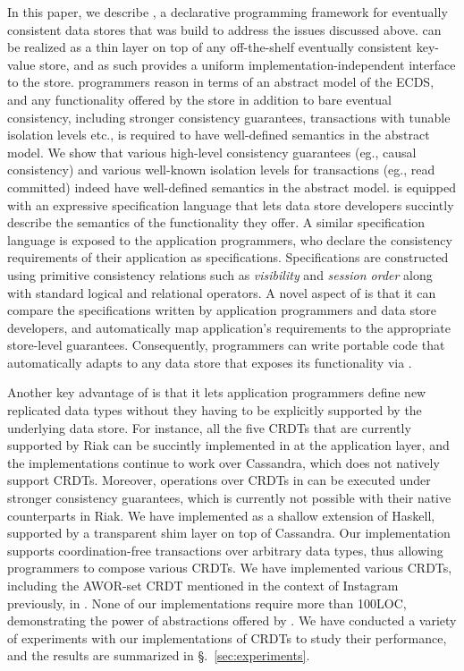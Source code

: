 In this paper, we describe \name, a declarative programming framework
for eventually consistent data stores that was build to address the
issues discussed above. \name can be realized as a thin layer on top
of any off-the-shelf eventually consistent key-value store, and as
such provides a uniform implementation-independent interface to the
store. \name programmers reason in terms of an abstract model of the
ECDS, and any functionality offered by the store in addition to bare
eventual consistency, including stronger consistency guarantees,
transactions with tunable isolation levels etc., is required to have
well-defined semantics in the abstract model. We show that various
high-level consistency guarantees (eg., causal consistency) and
various well-known isolation levels for transactions (eg., read
committed) indeed have well-defined semantics in the abstract model.
\name is equipped with an expressive specification language that lets
data store developers succintly describe the semantics of the
functionality they offer. A similar specification language is exposed
to the application programmers, who declare the consistency
requirements of their application as specifications. Specifications
are constructed using primitive consistency relations such as
\emph{visibility} and \emph{session order} along with standard logical
and relational operators. A novel aspect of \name is that it can
compare the specifications written by application programmers and data
store developers, and automatically map application's requirements to
the appropriate store-level guarantees. Consequently, \name
programmers can write portable code that automatically adapts to any
data store that exposes its functionality via \name. 

Another key advantage of \name is that it lets application programmers
define new replicated data types without they having to be explicitly
supported by the underlying data store. For instance, all the five
CRDTs that are currently supported by Riak can be succintly
implemented in \name at the application layer, and the implementations
continue to work over Cassandra, which does not natively support
CRDTs. Moreover, operations over CRDTs in \name can be executed under
stronger consistency guarantees, which is currently not possible with
their native counterparts in Riak. We have implemented \name as a
shallow extension of Haskell, supported by a transparent shim layer on
top of Cassandra. Our implementation supports coordination-free
transactions over arbitrary data types, thus allowing programmers to
compose various CRDTs. We have implemented various CRDTs, including
the AWOR-set CRDT mentioned in the context of Instagram previously, in
\name. None of our implementations require more than 100LOC,
demonstrating the power of abstractions offered by \name. We have
conducted a variety of experiments with our implementations of CRDTs
to study their performance, and the results are summarized in
\S.~\ref{sec:experiments}.

